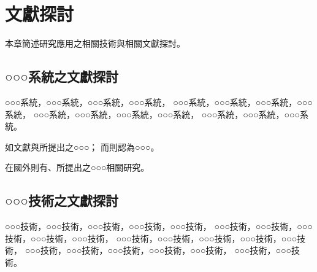 \chapter{文獻探討}
\label{chapter:literature}
本章簡述研究應用之相關技術與相關文獻探討。

\section{○○○系統之文獻探討}
    ○○○系統，○○○系統，○○○系統，○○○系統，
    ○○○系統，○○○系統，○○○系統，○○○系統，
    ○○○系統，○○○系統，○○○系統，○○○系統，
    ○○○系統，○○○系統，○○○系統。

    如文獻\cite{chen:2011}與\cite{hsiao:2013}所提出之○○○；
    而\cite{wan:2010}則認為○○○。

    在國外則有\cite{collobert:2001}、\cite{mell:2011}所提出之○○○相關研究。

\section{○○○技術之文獻探討}
    ○○○技術，○○○技術，○○○技術，○○○技術，○○○技術，
    ○○○技術，○○○技術，○○○技術，○○○技術，○○○技術，
    ○○○技術，○○○技術，○○○技術，○○○技術，○○○技術，
    ○○○技術，○○○技術，○○○技術，○○○技術，○○○技術，
    ○○○技術，○○○技術。
